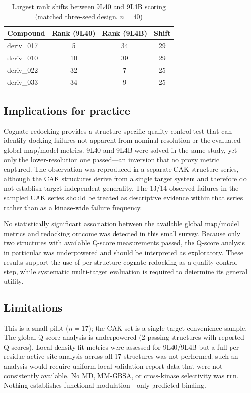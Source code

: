 \documentclass[global,twocolumn]{svjour}
\newcommand{\st}{\footnotesize\setlength{\tabcolsep}{3pt}}
\begin{document}
\begin{table}[t]
\centering
\caption{Largest rank shifts between 9L40 and 9L4B scoring (matched
three-seed design, $n=40$)}
\label{tab:errorprop}
\st
\begin{tabular}{lccc}
\toprule
Compound & Rank (9L40) & Rank (9L4B) & Shift \\
\midrule
deriv\_017 & 5  & 34 & 29 \\
deriv\_010 & 10 & 39 & 29 \\
deriv\_022 & 32 & 7  & 25 \\
deriv\_033 & 34 & 9  & 25 \\
\bottomrule
\end{tabular}
\end{table}

\subsection{Implications for practice}

Cognate redocking provides a structure-specific quality-control test that can
identify docking failures not apparent from nominal resolution or the evaluated
global map/model metrics. 9L40 and 9L4B were solved in the same study, yet
only the lower-resolution one passed---an inversion that no proxy metric
captured. The observation was reproduced in a separate CAK structure series,
although the CAK structures derive from a single target system and therefore do
not establish target-independent generality. The 13/14 observed failures in the
sampled CAK series should be treated as descriptive evidence within that series
rather than as a kinase-wide failure frequency.

No statistically significant association between the available global
map/model metrics and redocking outcome was detected in this small survey.
Because only two structures with available Q-score measurements passed, the
Q-score analysis in particular was underpowered and should be interpreted as
exploratory. These results support the use of per-structure cognate redocking
as a quality-control step, while systematic multi-target evaluation is required
to determine its general utility.

\subsection{Limitations}

This is a small pilot ($n=17$); the CAK set is a single-target convenience
sample. The global Q-score analysis is underpowered (2 passing structures with
reported Q-scores). Local density-fit metrics were assessed for 9L40/9L4B but
a full per-residue active-site analysis across all 17 structures was not
performed; such an analysis would require uniform local validation-report data
that were not consistently available. No MD, MM-GBSA, or cross-kinase
selectivity was run. Nothing establishes functional modulation---only predicted
binding.
\end{document}
